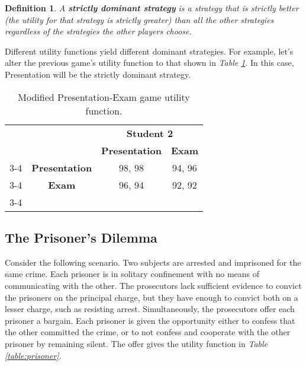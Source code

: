 \documentclass[twoside]{article}
\newtheorem{definition}[theorem]{Definition}
\begin{document}
\begin{definition}
A \textbf{strictly dominant strategy} is a strategy that is strictly better (the utility for that strategy is strictly greater) than all the other strategies regardless of the strategies the other players choose.
\end{definition}

Different utility functions yield different dominant strategies. For example, let's alter the previous game's utility function to that shown in {\em Table \ref{table:presentation2}}. In this case, Presentation will be the strictly dominant strategy.

\begin{table}[ht]
\begin{center}
\caption{Modified Presentation-Exam game utility function.}
\label{table:presentation2}
\begin{tabular}{l l p{7em} p{7em}}
                                                        &                                            & \multicolumn{2}{c}{\textbf{Student 2}}                    \\
                                                        &                                            & \textbf{Presentation}       & \textbf{Exam}               \\ \cline{3-4} 
\multicolumn{1}{c}{\multirow{2}{*}{\textbf{Student 1}}} & \multicolumn{1}{c|}{\textbf{Presentation}} & \multicolumn{1}{c|}{98, 98} & \multicolumn{1}{c|}{94, 96} \\ \cline{3-4} 
\multicolumn{1}{c}{}                                    & \multicolumn{1}{c|}{\textbf{Exam}}         & \multicolumn{1}{c|}{96, 94} & \multicolumn{1}{c|}{92, 92} \\ \cline{3-4} 
\end{tabular}
\end{center}
\end{table}

\subsection{The Prisoner's Dilemma}
Consider the following scenario. Two subjects are arrested and imprisoned for the same crime. Each prisoner is in solitary confinement with no means of communicating with the other. The prosecutors lack sufficient evidence to convict the prisoners on the principal charge, but they have enough to convict both on a lesser charge, such as resisting arrest. Simultaneously, the prosecutors offer each prisoner a bargain. Each prisoner is given the opportunity either to confess that the other committed the crime, or to not confess and cooperate with the other prisoner by remaining silent. The offer gives the utility function in {\em Table \ref{table:prisoner}}.
\end{document}
